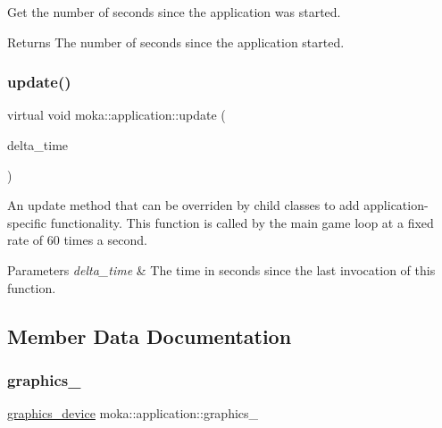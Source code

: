 Get the number of seconds since the application was started. 

\begin{DoxyReturn}{Returns}
The number of seconds since the application started. 
\end{DoxyReturn}
\mbox{\label{classmoka_1_1application_ab4c9190d4ffa3cdef1b184cac5b02b15}} 
\subsubsection{\texorpdfstring{update()}{update()}}
{\footnotesize\ttfamily virtual void moka\+::application\+::update (\begin{DoxyParamCaption}\item[{\mbox{\hyperlink{namespacemoka_a4b8e94fbfa287169990f1cc8171c0984}{game\+\_\+time}}}]{delta\+\_\+time }\end{DoxyParamCaption})\hspace{0.3cm}{\ttfamily [pure virtual]}}



An update method that can be overriden by child classes to add application-\/specific functionality. This function is called by the main game loop at a fixed rate of 60 times a second. 


\begin{DoxyParams}{Parameters}
{\em delta\+\_\+time} & The time in seconds since the last invocation of this function. \\
\hline
\end{DoxyParams}


\subsection{Member Data Documentation}
\mbox{\label{classmoka_1_1application_a9b6a8978832111b4e8e23c57042396ba}} 
\subsubsection{\texorpdfstring{graphics\_}{graphics\_}}
{\footnotesize\ttfamily \mbox{\hyperlink{classmoka_1_1graphics__device}{graphics\+\_\+device}} moka\+::application\+::graphics\+\_\+\hspace{0.3cm}{\ttfamily [protected]}}


